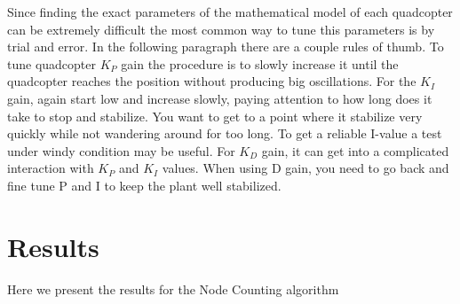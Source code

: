 Since finding the exact parameters of the mathematical model of each quadcopter can be extremely difficult the most common way to tune this parameters is by trial and error. In the following paragraph there are a couple rules of thumb. To tune quadcopter $K_P$ gain the procedure is to slowly increase it until the quadcopter reaches the position without producing big oscillations. For the $K_I$ gain, again start low and increase slowly, paying attention to how long does it take to stop and stabilize. You want to get to a point where it stabilize very quickly while not wandering around for too long. To get a reliable I-value a test under windy condition may be useful. For $K_D$ gain, it can get into a complicated interaction with $K_P$ and $K_I$ values. When using D gain, you need to go back and fine tune P and I to keep the plant well stabilized.

\section{Results}
Here we present the results for the Node Counting algorithm



